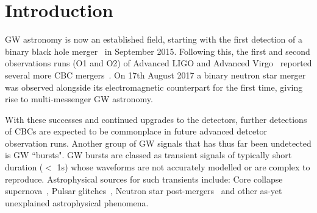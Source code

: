 \documentclass[12pt]{iopart}
\begin{document}
\section{Introduction}

%
\ac{GW} astronomy is now an established field, starting with the first
detection of a binary black hole merger~\cite{Abbott2016} in September 2015.
Following this, the first and second observations runs (O1 and O2) of Advanced
LIGO and Advanced Virgo~\cite{Prospects-dets, AdvLIGO, AdvLIGO2, AdvVIRGO}
reported several more \ac{CBC} mergers~\cite{Abbott2016a, Abbott2017,
Abbott2017a, Abbott2017b}. On 17th August 2017 a binary neutron star merger was
observed alongside its electromagnetic counterpart for the first time, giving
rise to multi-messenger \ac{GW} astronomy. 

%
With these successes and continued upgrades to the detectors, further
detections of \acp{CBC} are expected to be commonplace in future advanced
detcetor observation runs. Another group of \ac{GW} signals that has thus far
been undetected is \ac{GW} ``bursts". \ac{GW} bursts are classed as transient
signals of typically short duration ($<$ 1s) whose waveforms are not accurately
modelled or are complex to reproduce. Astrophysical sources for such transients
include: Core collapse supernova~\cite{Fryer_2003}, Pulsar
glitches~\cite{Andersson_2001}, Neutron star post-mergers~\cite{Baiotti_2007}
and other as-yet unexplained astrophysical phenomena. 
\end{document}
